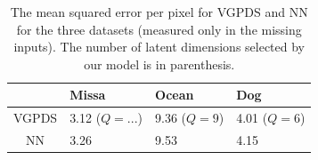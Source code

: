 \documentclass{article} %
\begin{document}
\begin{table}[h]
\caption{
\small{
The mean squared error per pixel for VGPDS and NN for the three datasets (measured only in the missing inputs). The number of latent dimensions selected by our model is in parenthesis. 
} }
\label{videoResultsTable}
\begin{center}
\begin{tabular}{c||l|l|l}
  & Missa & Ocean & Dog \\
\hline \hline
VGPDS  & 3.12 ($Q =...$) & 9.36 ($Q = 9$)  & 4.01 ($Q = 6$) \\  \hline
NN  & 3.26 & 9.53 & 4.15 \\
\end{tabular}
\end{center}
\end{table}
\end{document}
